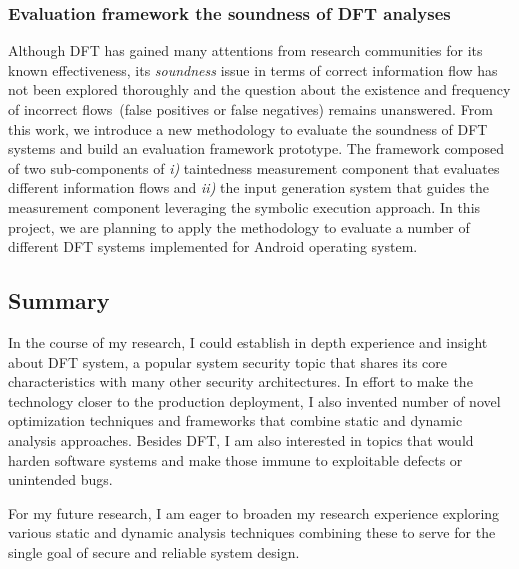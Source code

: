 \documentclass[letterpaper, 10pt]{article}
\begin{document}
\begin{small}
%

\subsubsection*{Evaluation framework the soundness of DFT analyses}
%
Although DFT has gained many attentions from research communities for its known
effectiveness, its {\it soundness} issue in terms of correct information flow
has not been explored thoroughly and the question about the existence and
frequency of incorrect flows~(false positives or false negatives) remains
unanswered. From this work, we introduce a new methodology to evaluate the
soundness of DFT systems and build an evaluation framework prototype. 
%
The framework composed of two sub-components of {\it i)} taintedness
measurement component that evaluates different information flows and {\it ii)}
the input generation system that guides the measurement component leveraging
the symbolic execution approach.
%
In this project, we are planning to apply the methodology to evaluate a number
of different DFT systems implemented for Android operating system.

\subsection*{Summary} 
%
In the course of my research, I could establish in depth experience and insight
about DFT system, a popular system security topic that shares its core
characteristics with many other security architectures.
%
In effort to make the technology closer to the production deployment, I also
invented number of novel optimization techniques and frameworks that combine
static and dynamic analysis approaches.
%
Besides DFT, I am also interested in topics that would harden software systems
and make those immune to exploitable defects or unintended bugs. 

For my future research, I am eager to broaden my research experience
exploring various static and dynamic analysis techniques combining these to
serve for the single goal of secure and reliable system design.

\end{small} 




\end{document}
